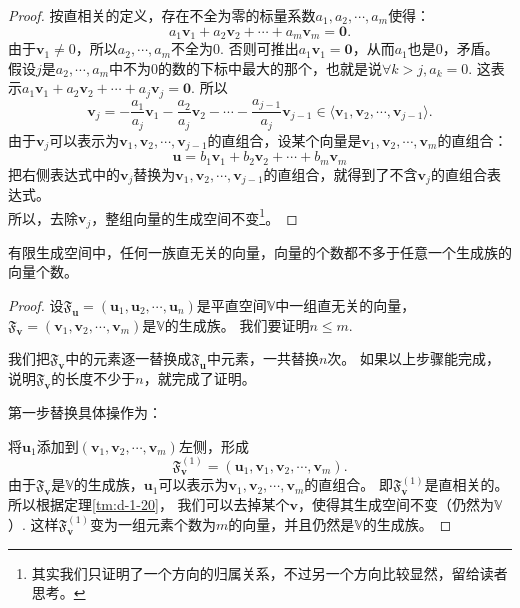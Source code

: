 \documentclass[12pt,UTF8]{ctexbook}
\begin{document}
\begin{appendix}
\begin{proof}
    按直相关的定义，存在不全为零的标量系数$a_1, a_2, \cdots, a_m$使得：
    $$ a_1\mathbf{v}_1+a_2\mathbf{v}_2+\cdots+a_m\mathbf{v}_m = \mathbf{0}. $$
    由于$\mathbf{v}_1 \neq 0$，所以$a_2, \cdots, a_m$不全为0. 否则可推出$a_1\mathbf{v}_1 = \mathbf{0}$，从而$a_1$也是0，矛盾。\\
    假设$j$是$a_2, \cdots, a_m$中不为0的数的下标中最大的那个，也就是说$\forall k > j, a_k = 0$. 这表示$ a_1\mathbf{v}_1+a_2\mathbf{v}_2+\cdots+a_j\mathbf{v}_j = \mathbf{0}. $
    所以
    $$ \mathbf{v}_j = -\frac{a_1}{a_j}\mathbf{v}_1-\frac{a_2}{a_j}\mathbf{v}_2-\cdots-\frac{a_{j-1}}{a_j}\mathbf{v}_{j-1} \in \langle \mathbf{v}_1, \mathbf{v}_2 , \cdots , \mathbf{v}_{j-1}\rangle. $$
    由于$ \mathbf{v}_j$可以表示为$\mathbf{v}_1, \mathbf{v}_2 , \cdots , \mathbf{v}_{j-1}$的直组合，设某个向量是$\mathbf{v}_1, \mathbf{v}_2 , \cdots , \mathbf{v}_m$的直组合：
    $$ \mathbf{u} = b_1\mathbf{v}_1+b_2\mathbf{v}_2+\cdots+b_m\mathbf{v}_m$$
    把右侧表达式中的$\mathbf{v}_j$替换为$\mathbf{v}_1, \mathbf{v}_2 , \cdots , \mathbf{v}_{j-1}$的直组合，就得到了不含$\mathbf{v}_j$的直组合表达式。\\
    所以，去除$\mathbf{v}_j$，整组向量的生成空间不变\footnote{其实我们只证明了一个方向的归属关系，不过另一个方向比较显然，留给读者思考。}。
\end{proof}

\begin{tm}\label{tm:d-1-30}
    有限生成空间中，任何一族直无关的向量，向量的个数都不多于任意一个生成族的向量个数。
\end{tm}

\begin{proof}
    
    设$\mathfrak{F}_{\mathbf{u}} = (\mathbf{u}_1, \mathbf{u}_2, \cdots , \mathbf{u}_n )$是平直空间$\mathbb{V}$中一组直无关的向量，
    $\mathfrak{F}_{\mathbf{v}} = (\mathbf{v}_1, \mathbf{v}_2, \cdots , \mathbf{v}_m )$是$\mathbb{V}$的生成族。
    我们要证明$n \leq m$. 

    我们把$\mathfrak{F}_{\mathbf{v}}$中的元素逐一替换成$\mathfrak{F}_{\mathbf{u}}$中元素，一共替换$n$次。
    如果以上步骤能完成，说明$\mathfrak{F}_{\mathbf{v}}$的长度不少于$n$，就完成了证明。

    第一步替换具体操作为：

    将$\mathbf{u}_1$添加到$(\mathbf{v}_1, \mathbf{v}_2, \cdots , \mathbf{v}_m )$左侧，形成
    $$\mathfrak{F}_{\mathbf{v}}^{(1)} = (\mathbf{u}_1, \mathbf{v}_1, \mathbf{v}_2, \cdots , \mathbf{v}_m ).$$
    由于$\mathfrak{F}_{\mathbf{v}}$是$\mathbb{V}$的生成族，$\mathbf{u}_1$可以表示为$\mathbf{v}_1, \mathbf{v}_2, \cdots , \mathbf{v}_m$的直组合。
    即$\mathfrak{F}_{\mathbf{v}}^{(1)}$是直相关的。所以根据定理\ref{tm:d-1-20}，
    我们可以去掉某个$\mathbf{v}$，使得其生成空间不变（仍然为$\mathbb{V}$）.
    这样$\mathfrak{F}_{\mathbf{v}}^{(1)}$变为一组元素个数为$m$的向量，并且仍然是$\mathbb{V}$的生成族。
    

\end{proof}
\end{appendix}
\end{document}

